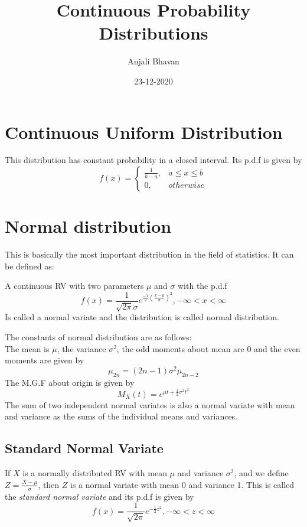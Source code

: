 \documentclass{article}
\title{Continuous Probability Distributions}
\date{23-12-2020}
\author{Anjali Bhavan}
\begin{document}
\maketitle
\section{Continuous Uniform Distribution}
This distribution has constant probability in a closed interval. Its p.d.f is given by
\begin{equation*}
f(x) = \begin{cases}
    \frac{1}{b-a}, & a \leq x \leq b \\
    0, & otherwise
\end{cases}
\end{equation*}
\section{Normal distribution}
This is basically the most important distribution in the field of statistics. It can be defined as:
\begin{definition}
    A continuous RV with two parameters $ \mu $ and $ \sigma $ with the p.d.f
    \begin{equation*}
    f(x) = \frac{1}{\sqrt{2 \pi} \sigma} e^{\frac{-1}{2}(\frac{x - \mu}{\sigma})^{2}}, -\infty < x < \infty
    \end{equation*}
    Is called a normal variate and the distribution is called normal distribution.
\end{definition}
The constants of normal distribution are as follows: \\
The mean is $ \mu $, the variance $ \sigma^{2} $, the odd moments about mean are 0 and the even moments are given by
\begin{equation*}
    \mu_{2n} = (2n-1) \sigma^{2} \mu_{2n-2}
\end{equation*}  
The M.G.F about origin is given by 
\begin{equation*}
M_{X}(t) = e^{\mu t + \frac{1}{2} \sigma^{2} t^{2}}
\end{equation*}
The sum of two independent normal variates is also a normal variate with mean and variance as the sums of the individual means and variances.

\subsection{Standard Normal Variate}
If $ X $ is a normally distributed RV with mean $ \mu $ and variance $ \sigma^{2} $, and we define $ Z = \frac{X - \mu}{\sigma} $, then $ Z $ is a normal variate
with mean 0 and variance 1. This is called the \textit{standard normal variate} and its p.d.f is given by
\begin{equation*}
f(x) = \frac{1}{\sqrt{2 \pi}} e^{-\frac{1}{2}z^{2}}, -\infty < z < \infty
\end{equation*}
\end{document}
